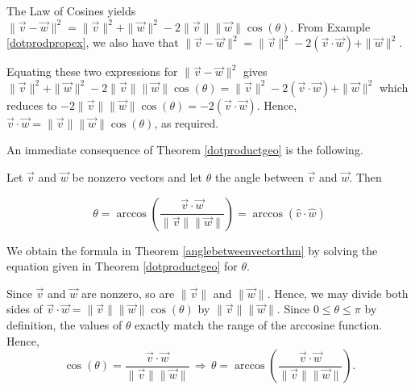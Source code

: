 \documentclass{ximera}
\begin{document}
The Law of Cosines yields $\| \overrightarrow{v} - \overrightarrow{w} \|^2 = \|\overrightarrow{v}\|^2 + \|\overrightarrow{w}\|^2 - 2\|\overrightarrow{v}\| \|\overrightarrow{w}\| \cos(\theta)$.  From Example \ref{dotprodpropex}, we also have that $\|\overrightarrow{v} - \overrightarrow{w}\|^2 = \|\overrightarrow{v}\|^2  -2 (\overrightarrow{v} \cdot \overrightarrow{w}) + \|\overrightarrow{w}\|^2$.  

 

Equating these two expressions for $\| \overrightarrow{v} - \overrightarrow{w} \|^2$ gives $\|\overrightarrow{v}\|^2 + \|\overrightarrow{w}\|^2 - 2\|\overrightarrow{v}\| \|\overrightarrow{w}\| \cos(\theta)  =  \|\overrightarrow{v}\|^2  -2 (\overrightarrow{v} \cdot \overrightarrow{w}) + \|\overrightarrow{w}\|^2$ which reduces to $- 2\|\overrightarrow{v}\| \|\overrightarrow{w}\| \cos(\theta) =   -2 (\overrightarrow{v} \cdot \overrightarrow{w})$. Hence,  $\overrightarrow{v} \cdot \overrightarrow{w} = \|\overrightarrow{v}\| \|\overrightarrow{w}\| \cos(\theta)$, as required. 
 

An immediate consequence of Theorem \ref{dotproductgeo} is the following.

 


\begin{theorem} \label{anglebetweenvectorthm} Let $\overrightarrow{v}$ and $\overrightarrow{w}$ be nonzero vectors and let $\theta$ the angle between $\overrightarrow{v}$ and $\overrightarrow{w}$.  Then  

\[ \theta = \arccos\left( \frac{\overrightarrow{v} \cdot \overrightarrow{w}}{\| \overrightarrow{v} \| \|\overrightarrow{w} \|}\right) = \arccos(\hat{v} \cdot \hat{w}) \]

 

\end{theorem}


 

We obtain the formula in Theorem \ref{anglebetweenvectorthm} by solving the equation given in Theorem \ref{dotproductgeo} for $\theta$.  

 

Since $\overrightarrow{v}$ and $\overrightarrow{w}$ are nonzero, so are $\| \overrightarrow{v} \|$ and $\|\overrightarrow{w}\|$.  Hence, we may divide both sides of $\overrightarrow{v} \cdot \overrightarrow{w} = \| \overrightarrow{v} \| \|\overrightarrow{w} \| \cos(\theta)$ by $\| \overrightarrow{v} \| \|\overrightarrow{w} \|$.  Since $0 \leq \theta \leq \pi$ by definition, the values of $\theta$ exactly match the range of the arccosine function.  Hence,  \[ \cos(\theta) = \frac{\overrightarrow{v} \cdot \overrightarrow{w}}{\| \overrightarrow{v} \| \|\overrightarrow{w} \|} \, \Rightarrow \,  \theta = \arccos\left( \frac{\overrightarrow{v} \cdot \overrightarrow{w}}{\| \overrightarrow{v} \| \|\overrightarrow{w} \|}\right).\]
\end{document}
